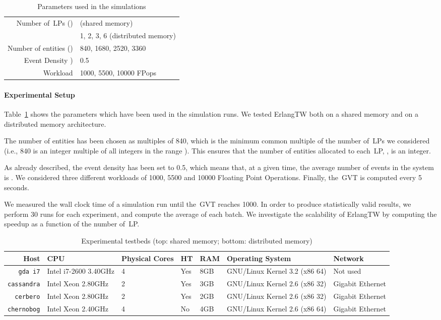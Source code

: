 \documentclass{sigplanconf}
\begin{document}
\begin{table}[t]
\centering \begin{tabular}{rl}
Number of~\acp{LP} ()   &  (shared memory) \\
                           & 1, 2, 3, 6 (distributed memory)\\
Number of entities ()   & 840, 1680, 2520, 3360 \\
Event Density )     & 0.5 \\
Workload                   & 1000, 5500, 10000 FPops \\
\end{tabular}
\caption{Parameters used in the simulations}\label{tab:parameters}
\end{table}

\paragraph{Experimental Setup}
Table~\ref{tab:parameters} shows the parameters which have been used
in the simulation runs. We tested ErlangTW both on a shared memory and
on a distributed memory architecture.

The number of entities  has been chosen as multiples of 840, which
is the minimum common multiple of the number of~\acp{LP} we considered
(i.e., 840 is an integer multiple of all integers in the range ). This ensures that the number of entities allocated to
each~\ac{LP}, , is an integer.

As already described, the event density has been set to 0.5, which
means that, at a given time, the average number of events in the system is .  We
considered three different workloads of 1000, 5500 and 10000 Floating
Point Operations. Finally, the~\ac{GVT} is computed every 5 seconds.

We measured the wall clock time of a simulation run until the~\ac{GVT}
reaches 1000. In order to produce statistically valid results, we
perform 30 runs for each experiment, and compute the average of each
batch. We investigate the scalability of ErlangTW by computing the
speedup as a function of the number  of~\ac{LP}.

\begin{table*}[t]
\centering\small
\begin{tabular}{rllllll}
\toprule
{\bf Host} & {\bf CPU} & {\bf Physical Cores} & {\bf HT} & {\bf RAM} & {\bf Operating System} & {\bf Network} \\
\midrule
\texttt{gda i7} & Intel i7-2600 3.40GHz & 4 & Yes & 8GB & GNU/Linux Kernel 3.2 (x86 64) & Not used \\
\midrule
\texttt{cassandra} & Intel Xeon 2.80GHz & 2 & Yes & 3GB & GNU/Linux Kernel 2.6 (x86 32) & Gigabit Ethernet \\
\texttt{cerbero} & Intel Xeon 2.80GHz & 2 & Yes & 2GB & GNU/Linux Kernel 2.6 (x86 32) & Gigabit Ethernet\\
\texttt{chernobog} & Intel Xeon 2.40GHz & 4 & No & 4GB & GNU/Linux Kernel 2.6 (x86 64) & Gigabit Ethernet\\
\bottomrule
\end{tabular}
\caption{Experimental testbeds (top: shared memory; bottom: distributed memory)}\label{tab:testbed}
\end{table*}
\end{document}
